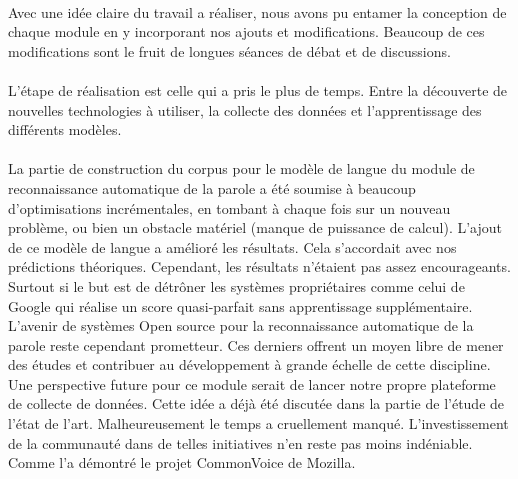 \paragraph{}
Avec une idée claire du travail a réaliser, nous avons pu entamer la conception de chaque module en y incorporant nos ajouts et modifications. Beaucoup de ces modifications sont le fruit de longues séances de débat et de discussions. 

\paragraph{}
L'étape de réalisation est celle qui a pris le plus de temps. Entre la découverte de nouvelles technologies à utiliser, la collecte des données et l'apprentissage des différents modèles.
\paragraph{}
La partie de construction du corpus pour le modèle de langue du module de reconnaissance automatique de la parole a été soumise à beaucoup d'optimisations incrémentales, en tombant à chaque fois sur un nouveau problème, ou bien un obstacle matériel (manque de puissance de calcul). L'ajout de ce modèle de langue a amélioré les résultats. Cela s'accordait avec nos prédictions théoriques. Cependant, les résultats n'étaient pas assez encourageants. Surtout si le but est de détrôner les systèmes propriétaires comme celui de Google qui réalise un score quasi-parfait sans apprentissage supplémentaire. L'avenir de systèmes Open source pour la reconnaissance automatique de la parole reste cependant prometteur. Ces derniers offrent un moyen libre de mener des études et contribuer au développement à grande échelle de cette discipline. Une perspective future pour ce module serait de lancer notre propre plateforme de collecte de données. Cette idée a déjà été discutée dans la partie de l'étude de l'état de l'art. Malheureusement le temps a cruellement manqué. L'investissement de la communauté dans de telles initiatives n'en reste pas moins indéniable. Comme l'a démontré le projet CommonVoice de Mozilla.
